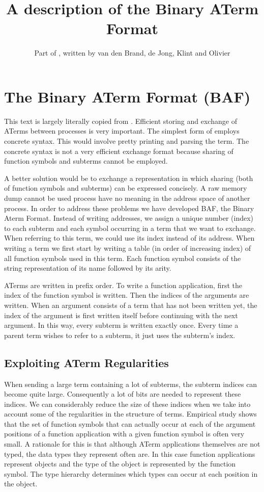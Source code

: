 \documentclass{article}
\title{A description of the Binary ATerm Format}
\author{Part of \cite{BJKO99}, written by van den Brand, de Jong, Klint and Olivier}
\date{}
\begin{document}
\maketitle
\section{The Binary ATerm Format (BAF)}
This text is largely literally copied from \cite{BJKO99}.
Efficient storing and exchange of ATerms between processes is very important.  
The simplest form of employs concrete syntax.
This would involve pretty printing and parsing the term.  
The concrete syntax is not a very efficient exchange format because sharing of function symbols and 
subterms cannot be employed.

A better solution would be to exchange a representation in which sharing (both of function symbols and subterms) 
can be expressed concisely. 
A raw memory dump cannot be used  process have no meaning in the address space of another process.
In order to address these problems we have developed BAF, the Binary Aterm Format. Instead of writing addresses, we assign a unique number
(index) to each subterm and each symbol occurring in a term that we want to exchange.  
When referring to this term, we could use its index instead of its address.
When writing a term  we first start by writing a table 
(in order of increasing index) of all function symbols used in this term. 
Each function symbol consists of the string representation of its name followed by its arity.

ATerms are written in prefix order. To write a function application, first the index of the function symbol
is written. Then the indices of the arguments are written. When an argument consists of a term that has not been 
written yet, the index of the argument is first written itself before continuing with the next argument. In this way,
every subterm is written exactly once. Every time a parent term wishes to refer to a subterm, it just 
uses the subterm's index.

\subsection{Exploiting ATerm Regularities}
When sending a large term containing a lot of subterms, the subterm indices can become quite large. 
Consequently a lot of bits are needed to represent these indices. 
We can considerably reduce the size of these indices when we take into account some of the regularities in the 
structure of terms. Empirical study shows that the set of function symbols that can actually occur at each 
of the argument positions of a function application with a given function symbol is often very small. 
A rationale for this is that although ATerm applications themselves are not typed, 
the data types they represent often are. 
In this case  function applications represent objects and the type of the object is represented 
by the function symbol. The type hierarchy determines which types can occur at each position in the object.
\end{document}
